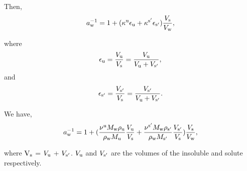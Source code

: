 \documentclass[12pt]{article}
\begin{document}
Then,
\begin{equation}\label{eqn:33}
a_{\rm w}^{-1}=1+ (\kappa^{\rm u} \epsilon_{\rm u} +\kappa^{\rm s'} \epsilon_{\rm s'}) \frac{V_{\rm s}}{V_{\rm w}},
\end{equation}

where
\begin{equation}\label{eqn:34}
\epsilon_{\rm u}=\frac{V_{\rm u}}{V_{\rm s}}=\frac{V_{\rm u}}{V_{\rm u}+V_{\rm s'}},
\end{equation}
and
\begin{equation}\label{eqn:35}
\epsilon_{\rm s'}=\frac{V_{\rm s'}}{V_{\rm s}}=\frac{V_{\rm s'}}{V_{\rm u}+V_{\rm s'}}.
\end{equation}

We have,
\begin{equation}\label{eqn:36}
a_{\rm w}^{-1}=1+ (  \frac{\nu^{\rm u} M_{\rm w} \rho_{\rm u}}{\rho_{\rm w}M_{\rm u}} 
\frac{V_{\rm u}}{V_{\rm s}} +
\frac{\nu^{\rm s'} M_{\rm w} \rho_{\rm s'}}{\rho_{\rm w} M_{\rm s'}}    
\frac{V_{\rm s'}}{V_{\rm s}})
\frac{V_{\rm s}}{V_{\rm w}},
\end{equation}

where $\rm V_{\rm s}$ = $ V_{\rm u}$ + $V_{\rm s'}$. $V_{\rm u}$ and $V_{\rm s'}$ are the volumes of the insoluble and solute respectively.
\end{document}
